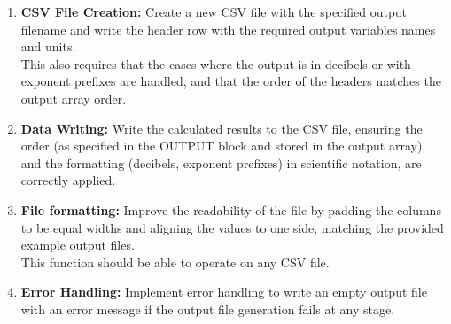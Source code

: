 \documentclass[a4paper]{article}
\begin{document}
\begin{enumerate}
    \item \textbf{CSV File Creation:} Create a new CSV file with the specified output filename and write the header row with the required output variables names and units.\\
    This also requires that the cases where the output is in decibels or with exponent prefixes are handled, and that the order of the headers matches the output array order.
    \item \textbf{Data Writing:} Write the calculated results to the CSV file, ensuring the order (as specified in the OUTPUT block and stored in the output array), 
    and the formatting (decibels, exponent prefixes) in scientific notation, are correctly applied.
    \item \textbf{File formatting:} Improve the readability of the file by padding the columns to be equal widths and aligning the values to one side, matching the provided example output files.\\
    This function should be able to operate on any CSV file.
    \item \textbf{Error Handling:} Implement error handling to write an empty output file with an error message if the output file generation fails at any stage.
\end{enumerate}
\end{document}
